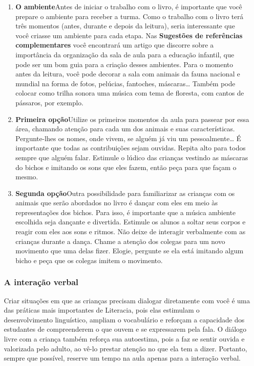 \documentclass[11pt]{extarticle}
\begin{document}
\begin{enumerate}
\item \textbf{O ambiente}\quad Antes de iniciar o trabalho com o livro, é importante que você 
prepare o ambiente para receber a turma. Como o trabalho com o livro terá 
três momentos (antes, durante e depois da leitura), seria interessante que você 
criasse um ambiente para cada etapa. Nas \textbf{Sugestões de referências complementares} 
você encontrará um artigo que discorre sobre a importância da organização da sala 
de aula para a educação infantil, que pode ser um bom guia para a criação desses 
ambientes. Para o momento antes da leitura, você pode decorar a sala com animais 
da fauna nacional e mundial na forma de fotos, pelúcias, fantoches, máscaras\dots{}
Também pode colocar como trilha sonora uma música com tema de floresta, com 
cantos de pássaros, por exemplo.


\item \textbf{Primeira opção}\quad Utilize os primeiros 
momentos da aula para passear por essa área, chamando atenção para cada um 
dos animais e suas características. Pergunte-lhes os nomes, onde vivem,
se alguém já viu um pessoalmente\dots{} É importante que todas as contribuições 
sejam ouvidas. Repita alto para todos sempre que alguém falar. Estimule
o lúdico das crianças vestindo as máscaras do bichos e imitando os 
sons que eles fazem, então peça para que façam o mesmo.



\item \textbf{Segunda opção}\quad Outra possibilidade para familiarizar 
as crianças com os animais que serão abordados no livro é dançar
com eles em meio às representações dos bichos. Para isso,
é importante que a música ambiente escolhida seja dançante
e divertida. Estimule os alunos a soltar seus corpos
e reagir com eles aos sons e ritmos. Não deixe de interagir
verbalmente com as crianças durante a dança.
Chame a atenção dos colegas para um novo movimento que uma
delas fizer. Elogie, pergunte se ela está imitando algum bicho e
peça que os colegas imitem o movimento.
\end{enumerate}


\subsubsection{A interação verbal} 
Criar situações em que as crianças precisam dialogar diretamente com 
você é uma das práticas mais importantes de Literacia, pois elas estimulam 
o desenvolvimento linguístico, ampliam o vocabulário e reforçam a 
capacidade dos estudantes de compreenderem o que ouvem e se expressarem 
pela fala. O diálogo livre com a criança também reforça sua autoestima, pois 
a faz se sentir ouvida e valorizada pelo adulto, ao vê-lo prestar atenção 
no que ela tem a dizer. Portanto, sempre que possível, reserve um tempo na 
aula apenas para a interação verbal. 
\end{document}
